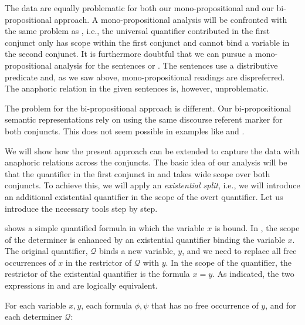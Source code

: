 \documentclass[output=paper]{langsci/langscibook}
\begin{document}
The data are equally problematic for both our mono-propositional and our bi-propositional approach. 
A mono-propositional analysis will be confronted with the same problem as , i.e., the universal quantifier contributed in the first conjunct only has scope within the first conjunct and cannot bind a variable in the second conjunct. 
It is furthermore doubtful that we can pursue a mono-propositional analysis for the sentences  or . The sentences use a distributive predicate and, as we saw above, mono-propositional readings are dispreferred. The anaphoric relation in the given sentences is, however, unproblematic.

\begin{sloppypar}
  The problem for the bi-propositional approach is different.  Our
  bi-propositional semantic representations rely on using the same
  discourse referent marker for both conjuncts. This does not seem
  possible in examples like  and
  .
\end{sloppypar}


We will show how the present approach can be extended to capture the data with anaphoric relations across the conjuncts. 
The basic idea of our analysis will be that the quantifier in the first conjunct in  and  takes wide scope over both conjuncts. 
To achieve this, we will apply an \emph{existential split}, i.e., we will introduce an additional existential quantifier in the scope of the overt quantifier. 
Let us introduce the necessary tools step by step.

 shows a simple quantified formula in which the variable $x$ is bound. In , the scope of the determiner is enhanced by an existential quantifier binding the variable $x$. 
The original quantifier, $\mathcal{Q}$ binds a new variable, $y$, and we need to replace all free occurrences of $x$ in the restrictor of $\mathcal{Q}$ with $y$. In the scope of the quantifier, the restrictor of the existential quantifier is the formula $x=y$. 
As indicated, the two expressions in   and  are logically equivalent. 


\ea \label{exist-split}
For each variable $x, y$, each formula $\phi, \psi$ that has no free occurrence of $y$, and for each determiner $\mathcal{Q}$:
\begin{xlist}
\end{xlist}
\z 
\end{document}
